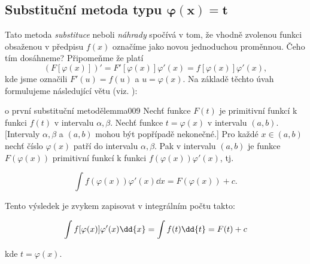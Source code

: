       
      
      
    \newpage
    \subsection[Substituční metoda typu \texorpdfstring{\(\varphi(x) = t\)}{\phi(x) = t}]
      {Substituční metoda typu \(\bm{\varphi(x) = t}\)}\label{mai:IchapVIIsecIIIssecIII} 
      
      Tato metoda \emph{substituce} neboli \emph{náhrady} spočívá v tom, že vhodně zvolenou funkci
      obsaženou v předpisu \(f(x)\) označíme jako novou jednoduchou proměnnou. Čeho tím dosáhneme?
      Připomeňme že platí\[\left(F[\varphi(x)]\right)'=F'[\varphi(x)]\varphi'(x) =
      f[\varphi(x)]\varphi'(x),\] kde jsme označili \(F'(u) = f(u)\) a \(u=\varphi(x)\). Na základě
      těchto úvah formulujeme následující větu (viz. \cite[p.~142]{diblik2002}):

      \begin{mathlemma}{o první substituční metodě}{lemma009}          
        Nechť funkce \(F(t)\) je primitivní funkcí k funkci \(f(t)\) v intervalu \(\alpha, \beta\).
        Nechť funkce \(t = \varphi(x)\) v intervalu \((a,b)\). [Intervaly \(\alpha, \beta\) a
        \((a,b)\) mohou být popřípadě nekonečné.] Pro každé \(x\in(a,b)\) nechť číslo \(\varphi(x)\)
        patří do intervalu \(\alpha, \beta\). Pak v intervalu \((a,b)\) je funkce \(F(\varphi(x))\)
        primitivní funkcí k funkci \(f(\varphi(x))\varphi'(x)\), tj. 
        \begin{fleqn}[0pt]
          \begin{equation}\label{mai:eq176}
            \int{f(\varphi(x))\varphi'(x)\dd{x}} = F(\varphi(x)) + c.
          \end{equation}
        \end{fleqn}
        Tento výsledek je zvykem zapisovat v integrálním počtu takto:
        \begin{fleqn}[0pt]
          \begin{equation}\label{mai:eq177}
            \int{f[\varphi(x)]\varphi'(x)\dd{x}}= \int f(t)\dd{t}= F(t)+c
            \raisetag{14pt}
          \end{equation}
        \end{fleqn}
        kde \(t=\varphi(x)\).
      \end{mathlemma}
  
